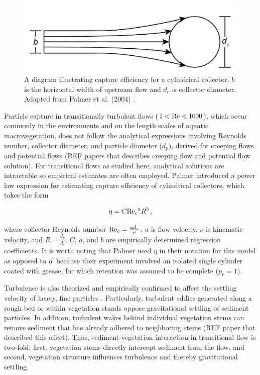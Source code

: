 \documentclass[geosciences,article,submit,moreauthors,pdftex]{Definitions/mdpi}
\begin{document}
\begin{figure}[H]
\includegraphics[width=5in]{../pics/collectorefficiency.png}
\centering
\caption{A diagram illustrating capture efficiency for a cylindrical collector. $b$ is the horizontal width of upstream flow and $d_c$ is collector diameter. Adapted from Palmer et al. (2004) \cite{Palmer_2004}.}
\label{fig:capeff}
\end{figure}

Particle capture in transitionally turbulent flows ($1<\mathrm{Re}<1000$), which occur commonly in the environments and on the length scales of aquatic macrovegetation, does not follow the analytical expressions involving Reynolds number, collector diameter, and particle diameter ($d_p$), derived for creeping flows and potential flows (REF papers that describes creeping flow and potential flow solution). For transitional flows as studied here, analytical solutions are intractable so empirical estimates are often employed. Palmer \cite{Palmer_2004} introduced a power law expression for estimating capture efficiency of cylindrical collectors, which takes the form 

\begin{equation}
    \eta=C{\mathrm{Re}_c}^{a}R^{b}\,,
    \label{eq:powerlaw}
\end{equation}

\noindent where collector Reynolds number $\mathrm{Re}_c=\frac{ud_c}{\nu}$, $u$ is flow velocity, $\nu$ is kinematic velocity, and $R=\frac{d_p}{d_c}$. $C$, $a$, and $b$ are empirically determined regression coefficients. It is worth noting that Palmer \cite{Palmer_2004} used $\eta$ in their notation for this model as opposed to $\eta^\prime$ because their experiment involved an isolated single cylinder coated with grease, for which retention was assumed to be complete ($p_r = 1$).

Turbulence is also theorized and empirically confirmed to affect the settling velocity of heavy, fine particles \citep{Nielsen_1993, Jacobs_2016, Wang_2018}. Particularly, turbulent eddies generated along a rough bed or within vegetation stands oppose gravitational settling of sediment particles. In addition, turbulent wakes behind individual vegetation stems can remove sediment that has already adhered to neighboring stems (REF paper that described this effect). Thus, sediment-vegetation interaction in transitional flow is two-fold: first, vegetation stems directly intercept sediment from the flow, and second, vegetation structure influences turbulence and thereby gravitational settling.
\end{document}
